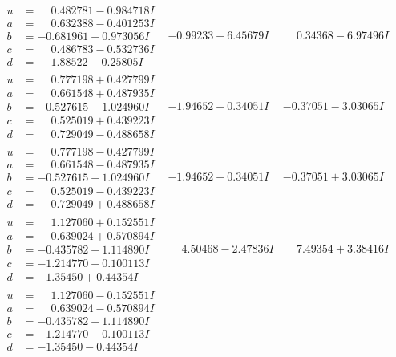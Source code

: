 \documentclass[1p]{elsarticle_modified}
\theoremstyle{definition}
\begin{document}
$$\begin{array}{c|c|c}
\begin{aligned}
u &= \phantom{-}0.482781 - 0.984718 I \\
a &= \phantom{-}0.632388 - 0.401253 I \\
b &= -0.681961 - 0.973056 I \\
c &= \phantom{-}0.486783 - 0.532736 I \\
d &= \phantom{-}1.88522 - 0.25805 I\end{aligned}
 & -0.99233 + 6.45679 I & \phantom{-}0.34368 - 6.97496 I \\ \hline\begin{aligned}
u &= \phantom{-}0.777198 + 0.427799 I \\
a &= \phantom{-}0.661548 + 0.487935 I \\
b &= -0.527615 + 1.024960 I \\
c &= \phantom{-}0.525019 + 0.439223 I \\
d &= \phantom{-}0.729049 - 0.488658 I\end{aligned}
 & -1.94652 - 0.34051 I & -0.37051 - 3.03065 I \\ \hline\begin{aligned}
u &= \phantom{-}0.777198 - 0.427799 I \\
a &= \phantom{-}0.661548 - 0.487935 I \\
b &= -0.527615 - 1.024960 I \\
c &= \phantom{-}0.525019 - 0.439223 I \\
d &= \phantom{-}0.729049 + 0.488658 I\end{aligned}
 & -1.94652 + 0.34051 I & -0.37051 + 3.03065 I \\ \hline\begin{aligned}
u &= \phantom{-}1.127060 + 0.152551 I \\
a &= \phantom{-}0.639024 + 0.570894 I \\
b &= -0.435782 + 1.114890 I \\
c &= -1.214770 + 0.100113 I \\
d &= -1.35450 + 0.44354 I\end{aligned}
 & \phantom{-}4.50468 - 2.47836 I & \phantom{-}7.49354 + 3.38416 I \\ \hline\begin{aligned}
u &= \phantom{-}1.127060 - 0.152551 I \\
a &= \phantom{-}0.639024 - 0.570894 I \\
b &= -0.435782 - 1.114890 I \\
c &= -1.214770 - 0.100113 I \\
d &= -1.35450 - 0.44354 I\end{aligned}

\end{array}$$
\end{document}
